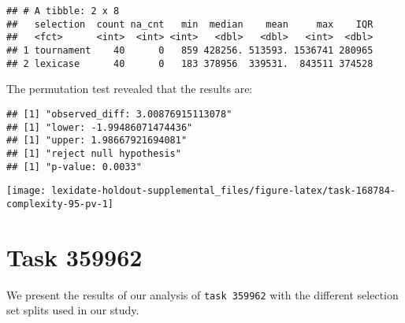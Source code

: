 \documentclass[
]{book}
\newenvironment{Shaded}{\begin{snugshade}}{\end{snugshade}}
\newcommand{\AttributeTok}[1]{\textcolor[rgb]{0.13,0.29,0.53}{#1}}
\newcommand{\DecValTok}[1]{\textcolor[rgb]{0.00,0.00,0.81}{#1}}
\newcommand{\FunctionTok}[1]{\textcolor[rgb]{0.13,0.29,0.53}{\textbf{#1}}}
\newcommand{\NormalTok}[1]{#1}
\newcommand{\OtherTok}[1]{\textcolor[rgb]{0.56,0.35,0.01}{#1}}
\newcommand{\SpecialCharTok}[1]{\textcolor[rgb]{0.81,0.36,0.00}{\textbf{#1}}}
\newcommand{\StringTok}[1]{\textcolor[rgb]{0.31,0.60,0.02}{#1}}
\begin{document}
\begin{verbatim}
## # A tibble: 2 x 8
##   selection  count na_cnt   min  median    mean     max    IQR
##   <fct>      <int>  <int> <int>   <dbl>   <dbl>   <int>  <dbl>
## 1 tournament    40      0   859 428256. 513593. 1536741 280965
## 2 lexicase      40      0   183 378956  339531.  843511 374528
\end{verbatim}

The permutation test revealed that the results are:

\begin{Shaded}
\end{Shaded}

\begin{verbatim}
## [1] "observed_diff: 3.00876915113078"
## [1] "lower: -1.99486071474436"
## [1] "upper: 1.98667921694081"
## [1] "reject null hypothesis"
## [1] "p-value: 0.0033"
\end{verbatim}

\texttt{[image: lexidate-holdout-supplemental\_files/figure-latex/task-168784-complexity-95-pv-1]}

\hypertarget{task-359962}{%
\chapter{Task 359962}\label{task-359962}}

We present the results of our analysis of \texttt{task\ 359962} with the different selection set splits used in our study.
\end{document}
